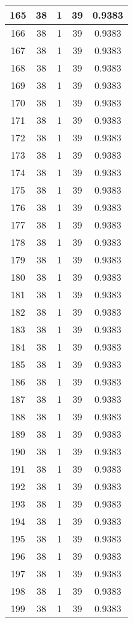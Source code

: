 \documentclass[letterpaper, 12pt]{article}
\begin{document}
\begin{longtable}{|c|c|c|c|c|}
\hline
165 & 38 & 1 & 39 & 0.9383 \\
\hline
166 & 38 & 1 & 39 & 0.9383 \\
\hline
167 & 38 & 1 & 39 & 0.9383 \\
\hline
168 & 38 & 1 & 39 & 0.9383 \\
\hline
169 & 38 & 1 & 39 & 0.9383 \\
\hline
170 & 38 & 1 & 39 & 0.9383 \\
\hline
171 & 38 & 1 & 39 & 0.9383 \\
\hline
172 & 38 & 1 & 39 & 0.9383 \\
\hline
173 & 38 & 1 & 39 & 0.9383 \\
\hline
174 & 38 & 1 & 39 & 0.9383 \\
\hline
175 & 38 & 1 & 39 & 0.9383 \\
\hline
176 & 38 & 1 & 39 & 0.9383 \\
\hline
177 & 38 & 1 & 39 & 0.9383 \\
\hline
178 & 38 & 1 & 39 & 0.9383 \\
\hline
179 & 38 & 1 & 39 & 0.9383 \\
\hline
180 & 38 & 1 & 39 & 0.9383 \\
\hline
181 & 38 & 1 & 39 & 0.9383 \\
\hline
182 & 38 & 1 & 39 & 0.9383 \\
\hline
183 & 38 & 1 & 39 & 0.9383 \\
\hline
184 & 38 & 1 & 39 & 0.9383 \\
\hline
185 & 38 & 1 & 39 & 0.9383 \\
\hline
186 & 38 & 1 & 39 & 0.9383 \\
\hline
187 & 38 & 1 & 39 & 0.9383 \\
\hline
188 & 38 & 1 & 39 & 0.9383 \\
\hline
189 & 38 & 1 & 39 & 0.9383 \\
\hline
190 & 38 & 1 & 39 & 0.9383 \\
\hline
191 & 38 & 1 & 39 & 0.9383 \\
\hline
192 & 38 & 1 & 39 & 0.9383 \\
\hline
193 & 38 & 1 & 39 & 0.9383 \\
\hline
194 & 38 & 1 & 39 & 0.9383 \\
\hline
195 & 38 & 1 & 39 & 0.9383 \\
\hline
196 & 38 & 1 & 39 & 0.9383 \\
\hline
197 & 38 & 1 & 39 & 0.9383 \\
\hline
198 & 38 & 1 & 39 & 0.9383 \\
\hline
199 & 38 & 1 & 39 & 0.9383 \\
\hline
\end{longtable}
\end{document}
